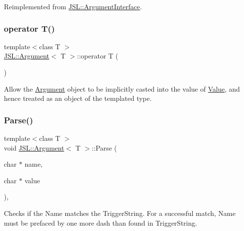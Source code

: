 Reimplemented from \hyperlink{classJSL_1_1ArgumentInterface_a256b5bd88b5f6638353f108c48f3ee65}{J\+S\+L\+::\+Argument\+Interface}.

\mbox{\label{classJSL_1_1Argument_a965bc0dfdce6e03380605af313f8c880}} 
\subsubsection{\texorpdfstring{operator T()}{operator T()}}
{\footnotesize\ttfamily template$<$class T $>$ \\
\hyperlink{classJSL_1_1Argument}{J\+S\+L\+::\+Argument}$<$ T $>$\+::operator T (\begin{DoxyParamCaption}{ }\end{DoxyParamCaption})\hspace{0.3cm}{\ttfamily [inline]}}



Allow the \hyperlink{classJSL_1_1Argument}{Argument} object to be implicitly casted into the value of \hyperlink{classJSL_1_1Argument_a83ada5bfa412192f76dd4290f679defd}{Value}, and hence treated as an object of the templated type. 

\mbox{\label{classJSL_1_1Argument_a8984e7ce23155259d90a3e98170f36e0}} 
\subsubsection{\texorpdfstring{Parse()}{Parse()}}
{\footnotesize\ttfamily template$<$class T $>$ \\
void \hyperlink{classJSL_1_1Argument}{J\+S\+L\+::\+Argument}$<$ T $>$\+::Parse (\begin{DoxyParamCaption}\item[{char $\ast$}]{name,  }\item[{char $\ast$}]{value }\end{DoxyParamCaption})\hspace{0.3cm}{\ttfamily [inline]}, {\ttfamily [virtual]}}



Checks if the Name matches the Trigger\+String. For a successful match, Name must be prefaced by one more dash than found in Trigger\+String. 


